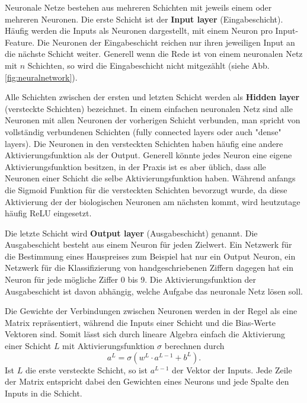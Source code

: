 Neuronale Netze bestehen aus mehreren Schichten mit jeweils einem oder mehreren Neuronen. Die erste Schicht ist der \textbf{Input layer} (Eingabeschicht). Häufig werden die Inputs als Neuronen dargestellt, mit einem Neuron pro Input-Feature. Die Neuronen der Eingabeschicht reichen nur ihren jeweiligen Input an die nächste Schicht weiter. Generell wenn die Rede ist von einem neuronalen Netz mit $n$ Schichten, so wird die Eingabeschicht nicht mitgezählt (siehe Abb. \ref{fig:neuralnetwork}).
\par
Alle Schichten zwischen der ersten und letzten Schicht werden als \textbf{Hidden layer} (versteckte Schichten) bezeichnet. In einem einfachen neuronalen Netz sind alle Neuronen mit allen Neuronen der vorherigen Schicht verbunden, man spricht von vollständig verbundenen Schichten (fully connected layers oder auch "dense" layers). Die Neuronen in den versteckten Schichten haben häufig eine andere Aktivierungsfunktion als der Output. Generell könnte jedes Neuron eine eigene Aktivierungsfunktion besitzen, in der Praxis ist es aber üblich, dass alle Neuronen einer Schicht die selbe Aktivierungsfunktion haben. Während anfangs die Sigmoid Funktion für die versteckten Schichten bevorzugt wurde, da diese Aktivierung der der biologischen Neuronen am nächsten kommt, wird heutzutage häufig ReLU eingesetzt.
\par
Die letzte Schicht wird \textbf{Output layer} (Ausgabeschicht) genannt. Die Ausgabeschicht besteht aus einem Neuron für jeden Zielwert. Ein Netzwerk für die Bestimmung eines Hauspreises zum Beispiel hat nur ein Output Neuron, ein Netzwerk für die Klassifizierung von handgeschriebenen Ziffern dagegen hat ein Neuron für jede mögliche Ziffer 0 bis 9. Die Aktivierungsfunktion der Ausgabeschicht ist davon abhängig, welche Aufgabe das neuronale Netz lösen soll.\\
\par
Die Gewichte der Verbindungen zwischen Neuronen werden in der Regel als eine Matrix repräsentiert, während die Inputs einer Schicht und die Bias-Werte Vektoren sind. Somit lässt sich durch lineare Algebra einfach die Aktivierung einer Schicht $L$ mit Aktivierungsfunktion $\sigma$ berechnen durch
\begin{equation}
    a^L = \sigma(w^L\cdot a^{L-1} + b^L).
\end{equation}
Ist $L$ die erste versteckte Schicht, so ist $a^{L-1}$ der Vektor der Inputs. Jede Zeile der Matrix entspricht dabei den Gewichten eines Neurons und jede Spalte den Inputs in die Schicht.\\

